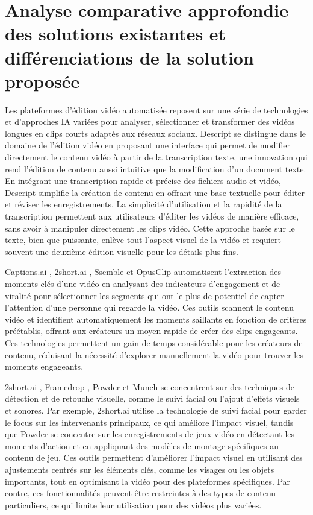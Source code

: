 \documentclass[livre]{udes-genie-these}
\begin{document}
\section{Analyse comparative approfondie des solutions existantes et différenciations de la solution proposée}


Les plateformes d’édition vidéo automatisée reposent sur une série de technologies et d’approches IA variées pour analyser, sélectionner et transformer des vidéos longues en clips courts adaptés aux réseaux sociaux. Descript \cite{descript2024} se distingue dans le domaine de l’édition vidéo en proposant une interface qui permet de modifier directement le contenu vidéo à partir de la transcription texte, une innovation qui rend l’édition de contenu aussi intuitive que la modification d’un document texte. En intégrant une transcription rapide et précise des fichiers audio et vidéo, Descript simplifie la création de contenu en offrant une base textuelle pour éditer et réviser les enregistrements. La simplicité d’utilisation et la rapidité de la transcription permettent aux utilisateurs d’éditer les vidéos de manière efficace, sans avoir à manipuler directement les clips vidéo. Cette approche basée sur le texte, bien que puissante, enlève tout l’aspect visuel de la vidéo et requiert souvent une deuxième édition visuelle pour les détails plus fins.

Captions.ai \cite{captions2024}, 2short.ai \cite{short2024}, Ssemble \cite{ssemble2024} et OpusClip \cite{opusclip2024} automatisent l’extraction des moments clés d’une vidéo en analysant des indicateurs d’engagement et de viralité pour sélectionner les segments qui ont le plus de potentiel de capter l’attention d’une personne qui regarde la vidéo. Ces outils scannent le contenu vidéo et identifient automatiquement les moments saillants en fonction de critères préétablis, offrant aux créateurs un moyen rapide de créer des clips engageants. Ces technologies permettent un gain de temps considérable pour les créateurs de contenu, réduisant la nécessité d’explorer manuellement la vidéo pour trouver les moments engageants.

2short.ai \cite{short2024}, Framedrop \cite{framedrop2024}, Powder \cite{powder2024} et Munch \cite{munch2024} se concentrent sur des techniques de détection et de retouche visuelle, comme le suivi facial ou l’ajout d’effets visuels et sonores. Par exemple, 2short.ai utilise la technologie de suivi facial pour garder le focus sur les intervenants principaux, ce qui améliore l’impact visuel, tandis que Powder \cite{powder2024} se concentre sur les enregistrements de jeux vidéo en détectant les moments d’action et en appliquant des modèles de montage spécifiques au contenu de jeu. Ces outils permettent d’améliorer l’impact visuel en utilisant des ajustements centrés sur les éléments clés, comme les visages ou les objets importants, tout en optimisant la vidéo pour des plateformes spécifiques. Par contre, ces fonctionnalités peuvent être restreintes à des types de contenu particuliers, ce qui limite leur utilisation pour des vidéos plus variées.
\end{document}
